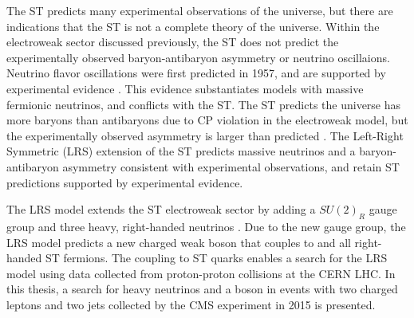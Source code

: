 The ST predicts many experimental observations of the universe, but there are indications that the ST is 
not a complete theory of the universe.  Within the electroweak sector discussed previously, the ST does 
not predict the experimentally observed baryon-antibaryon asymmetry or neutrino oscillaions.  Neutrino flavor 
oscillations were first predicted in 1957, and are supported by experimental evidence 
\cite{kamiokandeTwo,solarNuSummary,NOvAresults,mainzPhaseIIResults,t2kResults,dayaBayResults}.  This evidence substantiates 
models with massive fermionic neutrinos, and conflicts with the ST.  The ST predicts the universe has more 
baryons than antibaryons due to CP violation in the electroweak model, but the experimentally observed 
asymmetry is larger than predicted \cite{surveyOfExtensions}.  The Left-Right Symmetric (LRS) extension of 
the ST predicts massive neutrinos and a baryon-antibaryon asymmetry consistent with experimental observations, 
and retain ST predictions supported by experimental evidence.

The LRS model extends the ST electroweak sector by adding a $SU(2)_{R}$ gauge group and three heavy, right-handed 
neutrinos \nul.  Due to the new gauge group, the LRS model predicts a new charged weak boson \WR that couples to 
\nul and all right-handed ST fermions.  The \WR coupling to ST quarks enables a search for the LRS model using 
data collected from proton-proton collisions at the CERN LHC.  In this thesis, a search for heavy neutrinos \nul 
and a \WR boson in events with two charged leptons and two jets collected by the CMS experiment in 2015 
is presented.

